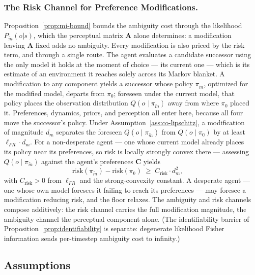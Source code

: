 \documentclass[runningheads]{llncs}
\begin{document}
\subsubsection{The Risk Channel for Preference Modifications.}
\label{sec:risk-channel}
Proposition~\ref{prop:mi-bound} bounds the ambiguity cost through the
likelihood $P_{\tilde m}(o|s)$, which the perceptual matrix $\mathbf{A}$ alone
determines: a modification leaving $\mathbf{A}$ fixed adds no ambiguity. Every
modification is also priced by the risk term, and through a single route. The
agent evaluates a candidate successor using the only model it holds at the
moment of choice --- its current one --- which is its estimate of an
environment it reaches solely across its Markov blanket. A modification to any
component yields a successor whose policy $\pi_{\tilde m}$, optimized for the
modified model, departs from $\pi_0$; foreseen under the current model, that
policy places the observation distribution $Q(o\mid\pi_{\tilde m})$ away from
where $\pi_0$ placed it. Preferences, dynamics, priors, and perception all enter
here, because all four move the successor's policy. Under
Assumption~\ref{ass:co-lipschitz}, a modification of magnitude $d_m$ separates
the foreseen $Q(o\mid\pi_{\tilde m})$ from $Q(o\mid\pi_0)$ by at least
$\ell_{FR}\cdot d_m$. For a non-desperate agent --- one whose current model
already places its policy near its preferences, so risk is locally strongly
convex there --- assessing $Q(o\mid\pi_{\tilde m})$ against the agent's
preferences $\mathbf{C}$ yields
\begin{equation}
\mathrm{risk}(\pi_{\tilde m}) - \mathrm{risk}(\pi_0)
  \;\geq\; C_{\mathrm{risk}}\cdot d_m^2,
\end{equation}
with $C_{\mathrm{risk}} > 0$ from $\ell_{FR}$ and the strong-convexity constant.
A desperate agent --- one whose own model foresees it failing to reach its
preferences --- may foresee a modification reducing risk, and the floor
relaxes. The ambiguity and risk channels compose additively: the risk channel
carries the full modification magnitude, the ambiguity channel the perceptual
component alone. (The identifiability barrier of Proposition~\ref{prop:identifiability} is separate: degenerate likelihood Fisher information sends per-timestep ambiguity cost to infinity.)

\subsection{Assumptions}
\end{document}
